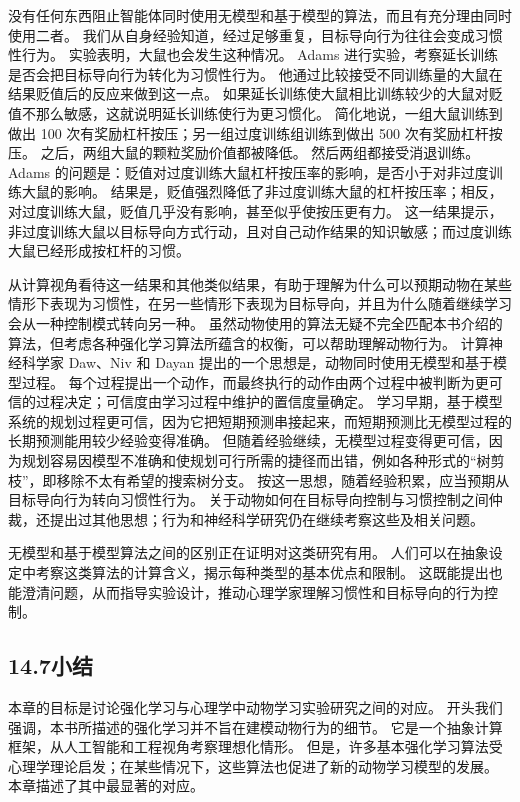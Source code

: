 \documentclass[UTF8, 12pt, fontset=fandol, oneside]{ctexart}
\begin{document}
没有任何东西阻止智能体同时使用无模型和基于模型的算法，而且有充分理由同时使用二者。
我们从自身经验知道，经过足够重复，目标导向行为往往会变成习惯性行为。
实验表明，大鼠也会发生这种情况。
Adams 进行实验，考察延长训练是否会把目标导向行为转化为习惯性行为。
他通过比较接受不同训练量的大鼠在结果贬值后的反应来做到这一点。
如果延长训练使大鼠相比训练较少的大鼠对贬值不那么敏感，这就说明延长训练使行为更习惯化。
简化地说，一组大鼠训练到做出 100 次有奖励杠杆按压；另一组过度训练组训练到做出 500 次有奖励杠杆按压。
之后，两组大鼠的颗粒奖励价值都被降低。
然后两组都接受消退训练。
Adams 的问题是：贬值对过度训练大鼠杠杆按压率的影响，是否小于对非过度训练大鼠的影响。
结果是，贬值强烈降低了非过度训练大鼠的杠杆按压率；相反，对过度训练大鼠，贬值几乎没有影响，甚至似乎使按压更有力。
这一结果提示，非过度训练大鼠以目标导向方式行动，且对自己动作结果的知识敏感；而过度训练大鼠已经形成按杠杆的习惯。

从计算视角看待这一结果和其他类似结果，有助于理解为什么可以预期动物在某些情形下表现为习惯性，在另一些情形下表现为目标导向，并且为什么随着继续学习会从一种控制模式转向另一种。
虽然动物使用的算法无疑不完全匹配本书介绍的算法，但考虑各种强化学习算法所蕴含的权衡，可以帮助理解动物行为。
计算神经科学家 Daw、Niv 和 Dayan 提出的一个思想是，动物同时使用无模型和基于模型过程。
每个过程提出一个动作，而最终执行的动作由两个过程中被判断为更可信的过程决定；可信度由学习过程中维护的置信度量确定。
学习早期，基于模型系统的规划过程更可信，因为它把短期预测串接起来，而短期预测比无模型过程的长期预测能用较少经验变得准确。
但随着经验继续，无模型过程变得更可信，因为规划容易因模型不准确和使规划可行所需的捷径而出错，例如各种形式的“树剪枝”，即移除不太有希望的搜索树分支。
按这一思想，随着经验积累，应当预期从目标导向行为转向习惯性行为。
关于动物如何在目标导向控制与习惯控制之间仲裁，还提出过其他思想；行为和神经科学研究仍在继续考察这些及相关问题。

无模型和基于模型算法之间的区别正在证明对这类研究有用。
人们可以在抽象设定中考察这类算法的计算含义，揭示每种类型的基本优点和限制。
这既能提出也能澄清问题，从而指导实验设计，推动心理学家理解习惯性和目标导向的行为控制。

\subsection*{14.7\quad 小结}

本章的目标是讨论强化学习与心理学中动物学习实验研究之间的对应。
开头我们强调，本书所描述的强化学习并不旨在建模动物行为的细节。
它是一个抽象计算框架，从人工智能和工程视角考察理想化情形。
但是，许多基本强化学习算法受心理学理论启发；在某些情况下，这些算法也促进了新的动物学习模型的发展。
本章描述了其中最显著的对应。
\end{document}
